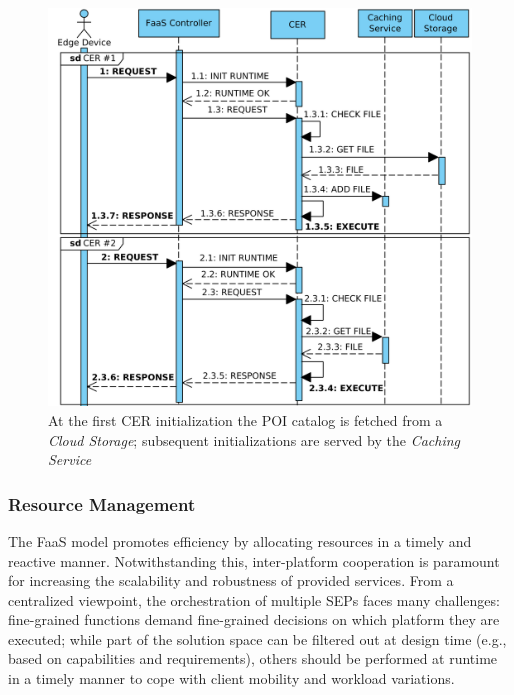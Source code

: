 \begin{figure}[!bp]
	\centering
	\includegraphics[width=1\linewidth]{Figs/CachingService}
	\caption{At the first CER initialization the POI catalog is fetched from a \textit{Cloud Storage}; subsequent initializations are served by the \textit{Caching Service}} 
	\label{fig:Mobile_Computation_Offloading_Caching}
\end{figure}


\subsubsection{Resource Management}
The FaaS model promotes efficiency by allocating resources in a timely and reactive manner. Notwithstanding this, inter-platform cooperation is paramount for increasing the scalability and robustness of provided services. 
From a centralized viewpoint, the orchestration of multiple SEPs faces many challenges: fine-grained functions demand fine-grained decisions on which platform they are executed; while part of the solution space can be filtered out at design time (e.g., based on capabilities and requirements), others should be performed at runtime in a timely manner to cope with client mobility and workload variations.

